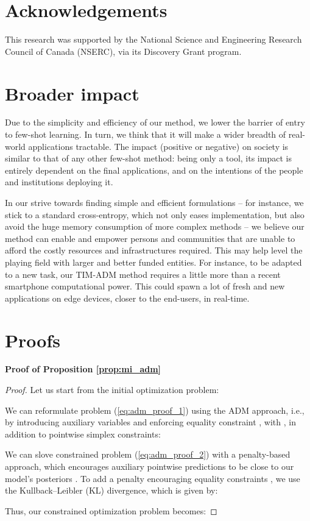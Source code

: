 \documentclass{article}
\begin{document}
\section{Acknowledgements}
This research was supported by the National Science and Engineering Research Council of Canada (NSERC), via its Discovery Grant program.


 
 \section*{Broader impact}

    Due to the simplicity and efficiency of our method, we lower the barrier of entry to few-shot learning. In turn, we think that it will make a wider breadth of real-world applications tractable. The impact (positive or negative) on society is similar to that of any other few-shot method: being only a tool, its impact is entirely dependent on the final applications, and on the intentions of the people and institutions deploying it.
    
    In our strive towards finding simple and efficient formulations -- for instance, we stick to a standard cross-entropy, which not only eases implementation, but also avoid the huge memory consumption of more complex methods -- we believe our method can enable and empower persons and communities that are unable to afford the costly resources and infrastructures required. This may help level the playing field with larger and better funded entities. For instance, to be adapted to a new task, our TIM-ADM method requires a little more than a recent smartphone computational power. This could spawn a lot of fresh and new applications on edge devices, closer to the end-users, in real-time. \clearpage





\clearpage
\appendix
\section{Proofs}\label{sec:proofs}

    \textbf{Proof of Proposition \ref{prop:mi_adm}}
        \begin{proof}
            Let us start from the initial optimization problem:
            
            We can reformulate problem (\ref{eq:adm_proof_1}) using the ADM approach, i.e., by introducing auxiliary variables  and enforcing 
            equality constraint , with , in addition to pointwise simplex constraints: 
	        
We can slove constrained problem (\ref{eq:adm_proof_2}) with a penalty-based approach, which encourages auxiliary pointwise predictions  to be close to our model's posteriors . To add a penalty encouraging equality constraints , we use the Kullback–Leibler (KL) divergence, which is given by:
	         
	         Thus, our constrained optimization problem becomes:
	         
        \end{proof}
        
\end{document}
